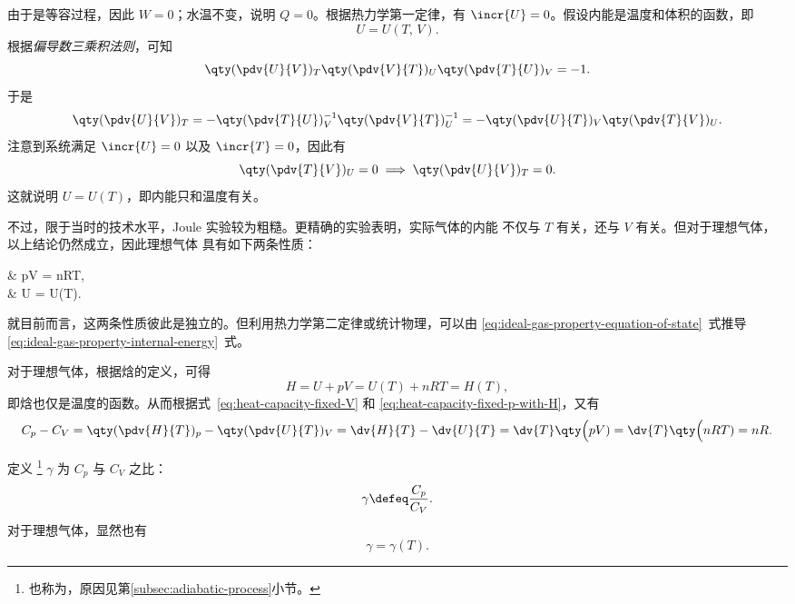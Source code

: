 由于是等容过程，因此 $W=0$；水温不变，说明 $Q=0$。根据热力学第一定律，有
$\incr{U}=0$。假设内能是温度和体积的函数，即
\begin{equation}
  U = U(T, \, V).
\end{equation}
根据\emph{偏导数三乘积法则}，可知
\begin{equation}
  \qty(\pdv{U}{V})_T \qty(\pdv{V}{T})_U \qty(\pdv{T}{U})_V = -1.
\end{equation}
于是
\begin{equation}
  \qty(\pdv{U}{V})_T
  = -\qty(\pdv{T}{U})_V^{-1} \qty(\pdv{V}{T})_U^{-1}
  = -\qty(\pdv{U}{T})_V \qty(\pdv{T}{V})_U.
\end{equation}
注意到系统满足 $\incr{U}=0$ 以及 $\incr{T}=0$，因此有
\begin{equation}
  \qty(\pdv{T}{V})_U = 0 \implies \qty(\pdv{U}{V})_T = 0.
\end{equation}
这就说明 $U = U(T)$，即内能只和温度有关。

不过，限于当时的技术水平，Joule 实验较为粗糙。更精确的实验表明，实际气体的内能
不仅与 $T$ 有关，还与 $V$ 有关。但对于理想气体，以上结论仍然成立，因此理想气体
具有如下两条性质：
\begin{braced}
  & pV = nRT,  \label{eq:ideal-gas-property-equation-of-state}\\
  & U  = U(T). \label{eq:ideal-gas-property-internal-energy}
\end{braced}
就目前而言，这两条性质彼此是独立的。但利用热力学第二定律或统计物理，可以由
\eqref{eq:ideal-gas-property-equation-of-state}~式推导
\eqref{eq:ideal-gas-property-internal-energy}~式。

对于理想气体，根据焓的定义，可得
\begin{equation}
  H = U + pV = U(T) + nRT = H(T),
\end{equation}
即焓也仅是温度的函数。从而根据式~\eqref{eq:heat-capacity-fixed-V} 和
\eqref{eq:heat-capacity-fixed-p-with-H}，又有
\begin{equation}
  C_p - C_V = \qty(\pdv{H}{T})_p - \qty(\pdv{U}{T})_V
  = \dv{H}{T} - \dv{U}{T} = \dv{T} \qty\Big(pV) = \dv{T} \qty\Big(nRT) = nR.
  \label{eq:C_p-C_V-for-ideal-gas}
\end{equation}

定义
\footnote{也称为，原因见第\ref{subsec:adiabatic-process}小节。}
$\gamma$ 为 $C_p$ 与 $C_V$ 之比：
\begin{equation} \label{eq:heat-capacity-ratio}
  \gamma \defeq \frac{C_p}{C_V}.
\end{equation}
对于理想气体，显然也有
\begin{equation}
  \gamma = \gamma(T).
\end{equation}

